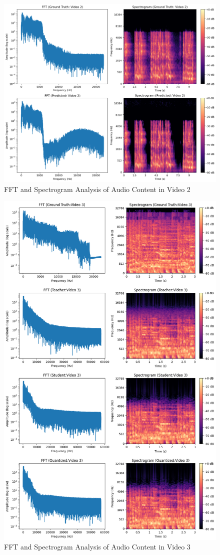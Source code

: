 \begin{figure}[H]
    \centering
    \includegraphics[width=0.8\linewidth]{assets/audio_video_analysis/Video_2_analysis.png}
    \caption{FFT and Spectrogram Analysis of Audio Content in Video 2}
    \label{fig:fft-spec-v2}
\end{figure}

\begin{figure}[H]
    \centering
    \includegraphics[width=0.7\linewidth]{assets/quantization/fft_spectrogram_Video3.png}
    \caption{FFT and Spectrogram Analysis of Audio Content in Video 3}
    \label{fig:fft-spec-v3}
\end{figure}

